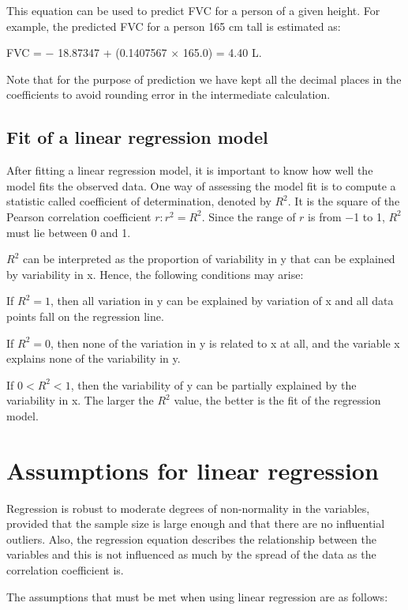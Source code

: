 \documentclass[
  a4paper,
]{memoir}
\newcounter{none} %
\begin{document}
This equation can be used to predict FVC for a person of a given height.
For example, the predicted FVC for a person 165 cm tall is estimated as:

FVC = − 18.87347 + (0.1407567 \(\times\) 165.0) = 4.40 L.

Note that for the purpose of prediction we have kept all the decimal
places in the coefficients to avoid rounding error in the intermediate
calculation.

\subsection{Fit of a linear regression
model}\label{fit-of-a-linear-regression-model}

After fitting a linear regression model, it is important to know how
well the model fits the observed data. One way of assessing the model
fit is to compute a statistic called coefficient of determination,
denoted by \(R^2\). It is the square of the Pearson correlation
coefficient \(r: r^2 = R^2\). Since the range of \(r\) is from −1 to 1,
\(R^2\) must lie between 0 and 1.

\(R^2\) can be interpreted as the proportion of variability in y that
can be explained by variability in x. Hence, the following conditions
may arise:

If \(R^2 = 1\), then all variation in y can be explained by variation of
x and all data points fall on the regression line.

If \(R^2 = 0\), then none of the variation in y is related to x at all,
and the variable x explains none of the variability in y.

If \(0 < R^2 <1\), then the variability of y can be partially explained
by the variability in x. The larger the \(R^2\) value, the better is the
fit of the regression model.

\section{Assumptions for linear
regression}\label{assumptions-for-linear-regression}

Regression is robust to moderate degrees of non-normality in the
variables, provided that the sample size is large enough and that there
are no influential outliers. Also, the regression equation describes the
relationship between the variables and this is not influenced as much by
the spread of the data as the correlation coefficient is.

The assumptions that must be met when using linear regression are as
follows:
\end{document}
